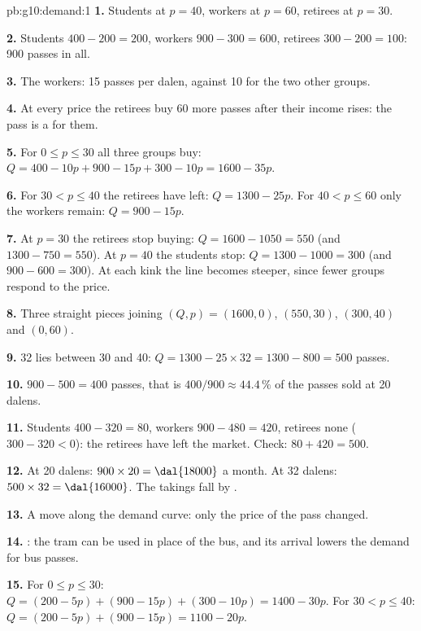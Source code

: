 \begin{solution}{pb:g10:demand:1}
\textbf{1.} Students at $p = 40$, workers at $p = 60$, retirees at $p = 30$.

\textbf{2.} Students $400 - 200 = 200$, workers $900 - 300 = 600$, retirees $300 - 200 = 100$: 900 passes in all.

\textbf{3.} The workers: 15 passes per dalen, against 10 for the two other groups.

\textbf{4.} At every price the retirees buy 60 more passes after their income rises: the pass is a  for them.

\textbf{5.} For $0 \le p \le 30$ all three groups buy: $Q = 400 - 10p + 900 - 15p + 300 - 10p = 1600 - 35p$.

\textbf{6.} For $30 < p \le 40$ the retirees have left: $Q = 1300 - 25p$. For $40 < p \le 60$ only the workers remain: $Q = 900 - 15p$.

\textbf{7.} At $p = 30$ the retirees stop buying: $Q = 1600 - 1050 = 550$ (and $1300 - 750 = 550$). At $p = 40$ the students stop:
$Q = 1300 - 1000 = 300$ (and $900 - 600 = 300$). At each kink the line becomes steeper, since fewer groups respond to the price.

\textbf{8.} Three straight pieces joining $(Q, p) = (1600, 0)$, $(550, 30)$, $(300, 40)$ and $(0, 60)$.

\textbf{9.} 32 lies between 30 and 40: $Q = 1300 - 25 \times 32 = 1300 - 800 = 500$ passes.

\textbf{10.} $900 - 500 = 400$ passes, that is $400/900 \approx 44.4\,\%$ of the passes sold at 20 dalens.

\textbf{11.} Students $400 - 320 = 80$, workers $900 - 480 = 420$, retirees none ($300 - 320 < 0$): the retirees have left the market.
Check: $80 + 420 = 500$.

\textbf{12.} At 20 dalens: $900 \times 20 = \text{\dal{18000}}$ a month. At 32 dalens: $500 \times 32 = \text{\dal{16000}}$. The takings fall by
.

\textbf{13.} A move along the demand curve: only the price of the pass changed.

\textbf{14.} : the tram can be used in place of the bus, and its arrival lowers the demand for bus passes.

\textbf{15.} For $0 \le p \le 30$: $Q = (200 - 5p) + (900 - 15p) + (300 - 10p) = 1400 - 30p$. For $30 < p \le 40$: $Q = (200 - 5p) +
(900 - 15p) = 1100 - 20p$.


\end{solution}

